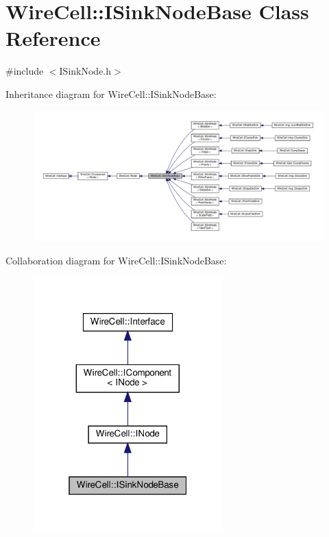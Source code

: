 \hypertarget{class_wire_cell_1_1_i_sink_node_base}{}\section{Wire\+Cell\+:\+:I\+Sink\+Node\+Base Class Reference}
\label{class_wire_cell_1_1_i_sink_node_base}


{\ttfamily \#include $<$I\+Sink\+Node.\+h$>$}



Inheritance diagram for Wire\+Cell\+:\+:I\+Sink\+Node\+Base\+:
\nopagebreak
\begin{figure}[H]
\begin{center}
\leavevmode
\includegraphics[width=350pt]{class_wire_cell_1_1_i_sink_node_base__inherit__graph}
\end{center}
\end{figure}


Collaboration diagram for Wire\+Cell\+:\+:I\+Sink\+Node\+Base\+:
\nopagebreak
\begin{figure}[H]
\begin{center}
\leavevmode
\includegraphics[width=208pt]{class_wire_cell_1_1_i_sink_node_base__coll__graph}
\end{center}
\end{figure}
